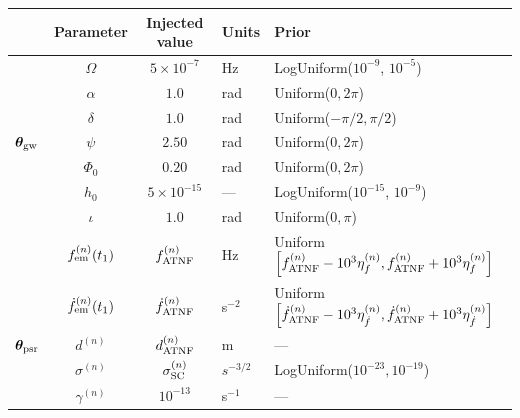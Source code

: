 \documentclass[fleqn,usenatbib,useAMS]{mnras}
\begin{document}
\begin{table}
	\centering
	\begin{tabular}{lccll}
		\toprule
		&Parameter & Injected value & Units & Prior  \\
		\hline
		\multirow{7}{2mm}{$\boldsymbol{\theta}_{\rm gw}$} & $\Omega$       & $5 \times 10^{-7}$ & Hz & LogUniform($10^{-9}$, $10^{-5}$) \\
	  & $\alpha$          & $1.0$  & rad & Uniform($0, 2 \pi $)\\
	  & $\delta$              & $1.0$  & rad & Uniform($-\pi/2, \pi/2$) \\
	  & $\psi$              & $2.50$ & rad & Uniform($0, 2 \pi $) \\
	  & $\Phi_0$          & $0.20$ & rad & Uniform($0, 2 \pi $) \\
	  & $h_0$            & $5 \times 10^{-15}$ & --- & LogUniform($10^{-15}$, $10^{-9}$) \\
	  & $\iota$             & $1.0$ & rad & Uniform($0, \pi$) \\ 
		\hline
		 & $f_{\rm em}^{(n)} (t_1)$       & $f_{\rm ATNF}^{(n)}$ & Hz & Uniform$\left[f_{\rm ATNF}^{(n)} - 10^3 \eta^{(n)}_{f}, f_{\rm ATNF}^{(n)} + 10^3 \eta^{(n)}_{f} \right]$ \\
		& $\dot{f}_{\rm em}^{(n)} (t_1)$       & $\dot{f}_{\rm ATNF}^{(n)}$ & s$^{-2}$ & Uniform$\left[ \dot{f}_{\rm ATNF}^{(n)} - 10^3 \eta^{(n)}_{\dot{f}}, \dot{f}_{\rm ATNF}^{(n)} + 10^3 \eta^{(n)}_{\dot{f}} \right]$ \\
		\vspace{1mm} $\boldsymbol{\theta}_{\rm psr}$ &  $d^{(n)}$       &$d_{\rm ATNF}^{(n)}$  & m & --- \\
		\vspace{1mm} & $\sigma^{(n)}$              & $\sigma_{\rm SC}^{(n)}$ & $s^{-3/2}$ & LogUniform($10^{-23}, 10^{-19}$) \\
		& $\gamma^{(n)}$              & $10^{-13}$ & s$^{-1}$ & --- \\
		\bottomrule
	\end{tabular}

\end{table}
\end{document}
